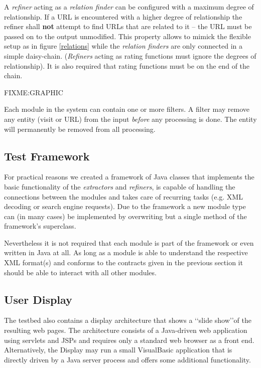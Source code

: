 \documentclass[a4paper]{danarticle}
\theoremstyle{remark}
\begin{document}
      A \textit{refiner} acting as a \textit{relation finder} can be configured 
      with a maximum degree of relationship. If a URL is encountered with a 
      higher degree of relationship the refiner shall \textbf{not} attempt to 
      find URLs that are related to it -- the URL must be passed on to the 
      output unmodified. This property allows to mimick the flexible setup as in 
      figure \ref{relations} while the \textit{relation finders} are only 
      connected in a simple daisy-chain. (\textit{Refiners} acting as rating 
      functions must ignore the degrees of relationship). It is also required 
      that rating functions must be on the end of the chain.
      
      FIXME:GRAPHIC
      
      Each module in the system can contain one or more filters. A filter may 
      remove any entity (visit or URL) from the input \textit{before} any 
      processing is done. The entity will permanently be removed from all 
      processing.
    \subsection{Test Framework}
      For practical reasons we created a framework of Java classes that 
      implements the basic functionality of the \textit{extractors} and 
      \textit{refiners}, is capable of handling the connections between the 
      modules and takes care of recurring tasks (e.g. XML decoding or search 
      engine requests). Due to the framework a new module type can (in many 
      cases) be implemented by overwriting but a single method of the 
      framework's superclass.
      
      Nevertheless it is not required that each module is part of the 
      framework or even written in Java at all. As long as a module is able to 
      understand the respective XML format(s) and conforms to the contracts 
      given in the previous section it should be able to interact with all 
      other modules.
    \subsection{User Display}
      The testbed also contains a display architecture that shows a \lq\lq slide
      show\rq\rq of the resulting web pages. The architecture consists of a
      Java-driven web application using servlets and JSPs and requires only a
      standard web browser as a front end. Alternatively, the Display may run a
      small VisualBasic application that is directly driven by a Java server
      process and offers some additional functionality.
      
\end{document}
